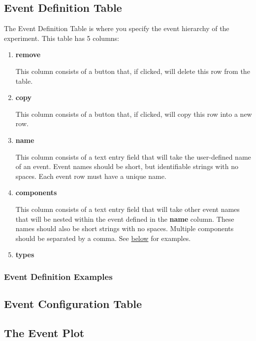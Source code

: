 \documentclass[10pt]{article}
\begin{document}
	\subsection{Event Definition Table}
	\label{subsec:event_table}
		The Event Definition Table is where you specify the event hierarchy of the experiment.
		This table has 5 columns:
		\begin{enumerate}
			\item \textbf{remove}

				This column consists of a button that, if clicked, will delete this row from the table.

			\item \textbf{copy}

				This column consists of a button that, if clicked, will copy this row into a new row.

			\item \textbf{name}

				This column consists of a text entry field that will take the user-defined name of an event.
				Event names should be short, but identifiable strings with no spaces.
				Each event row must have a unique name.

			\item \textbf{components}

				This column consists of a text entry field that will take other event names that will be nested within the event defined in the \textbf{name} column.
				These names should also be short strings with no spaces.
				Multiple components should be separated by a comma.
				See \hyperref[subsubsec:def_ex]{below} for examples.

			\item \textbf{types}
		\end{enumerate}

		\subsubsection{Event Definition Examples}
		\label{subsubsec:def_ex}


	\subsection{Event Configuration Table}
	\label{subsec:event_config}

	\subsection{The Event Plot}
	\label{subsec:event_plot}
\end{document}

